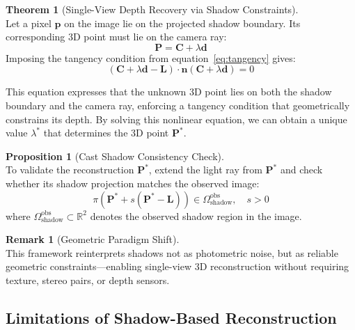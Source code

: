 \documentclass[12pt]{article}
\newcommand{\R}{\mathbb{R}}
\newcommand{\vect}[1]{\bm{#1}}
\theoremstyle{definition}
\newtheorem{theorem}{Theorem}[section]
\newtheorem{proposition}{Proposition}[section]
\newtheorem{remark}{Remark}[section]
\begin{document}
\begin{theorem}[Single-View Depth Recovery via Shadow Constraints] ~\\
Let a pixel $\vect{p}$ on the image lie on the projected shadow boundary. Its corresponding 3D point must lie on the camera ray:
\begin{equation}
\vect{P} = \vect{C} + \lambda \vect{d}
\end{equation}
Imposing the tangency condition from equation~\eqref{eq:tangency} gives:
\begin{equation}
\boxed{(\vect{C} + \lambda \vect{d} - \vect{L}) \cdot \vect{n}(\vect{C} + \lambda \vect{d}) = 0} \label{eq:shadow_constraint}
\end{equation}
\end{theorem}

This equation expresses that the unknown 3D point lies on both the shadow boundary and the camera ray, enforcing a tangency condition that geometrically constrains its depth. By solving this nonlinear equation, we can obtain a unique value $\lambda^*$ that determines the 3D point $\vect{P}^*$.

\begin{proposition}[Cast Shadow Consistency Check] ~\\
To validate the reconstruction $\vect{P}^*$, extend the light ray from $\vect{P}^*$ and check whether its shadow projection matches the observed image:
\begin{equation}
\boxed{
\pi(\vect{P}^* + s(\vect{P}^* - \vect{L})) \in \Omega_{\text{shadow}}^{\text{obs}}, \quad s > 0
}
\end{equation}
where $\Omega_{\text{shadow}}^{\text{obs}} \subset \R^2$ denotes the observed shadow region in the image.
\end{proposition}

\begin{remark}[Geometric Paradigm Shift] ~\\
This framework reinterprets shadows not as photometric noise, but as reliable geometric constraints—enabling single-view 3D reconstruction without requiring texture, stereo pairs, or depth sensors.
\end{remark}

\newpage

\subsection{Limitations of Shadow-Based Reconstruction}
\end{document}
